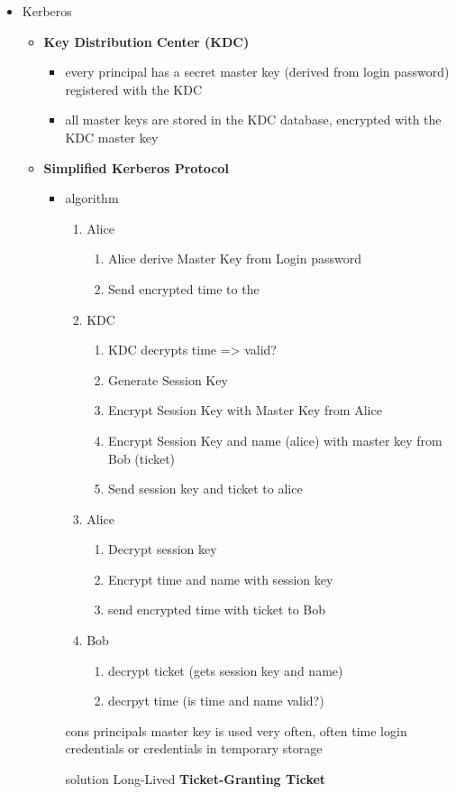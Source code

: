 \documentclass[11pt,twoside,landscape]{article}
\begin{document}
\begin{multicols}{4}
\begin{itemize}
\item Kerberos
\label{sec:orgf072ed5}
\begin{itemize}
\item \textbf{Key Distribution Center (KDC)}
\begin{itemize}
\item every principal has a secret master key (derived from login password) registered with the KDC
\item all master keys are stored in the KDC database, encrypted with the KDC master key
\end{itemize}

\item \textbf{Simplified Kerberos Protocol}
\begin{itemize}
\item algorithm 
\begin{enumerate}
\item Alice
\begin{enumerate}
\item Alice derive Master Key from Login password
\item Send encrypted time to the
\end{enumerate}
\item KDC
\begin{enumerate}
\item KDC decrypts time => valid?
\item Generate Session Key
\item Encrypt Session Key with Master Key from Alice
\item Encrypt Session Key and name (alice) with master key from Bob (ticket)
\item Send session key and ticket to alice
\end{enumerate}
\item Alice
\begin{enumerate}
\item Decrypt session key
\item Encrypt time and name with session key
\item send encrypted time with ticket to Bob
\end{enumerate}
\item Bob
\begin{enumerate}
\item decrypt ticket (gets session key and name)
\item decrpyt time (is time and name valid?)
\end{enumerate}
\end{enumerate}
\item[{cons}] principals master key is used very often, often time login credentials or credentials in temporary storage
\item[{solution}] Long-Lived \textbf{Ticket-Granting Ticket}
\end{itemize}


\end{itemize}
\end{itemize}
\end{multicols}
\end{document}
